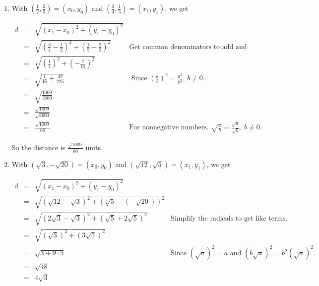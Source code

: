\documentclass{ximera}
\begin{document}
\begin{example}
\begin{enumerate}
\setlength{\extrarowheight}{2pt}

 

So the distance is $3 \sqrt{5}$ units.

\item With $\left( \frac{1}{2}, \frac{2}{3}\right) =  \left(x_0, y_0\right)$ and  $\left( \frac{3}{4}, \frac{1}{5}\right) = \left(x_1, y_1\right)$, we get

\setlength{\extrarowheight}{3pt}

\[ \begin{array}{rclr}

 d & = & \sqrt{\left(x_1 - x_0 \right)^2 + \left(y_1 - y_0 \right)^2} & \\
   & = & \sqrt{ \left(\frac{3}{4}-\frac{1}{2} \right)^2 + \left(\frac{1}{5} - \frac{2}{3} \right)^2} &  \text{Get common denominators to add and subtract fractions.}\\
   & = & \sqrt{\left(\frac{1}{4} \right)^2 + \left(-\frac{7}{15} \right)^2} &\\
   & = & \sqrt{\frac{1}{16} + \frac{49}{225}} &  \text{ Since $\left(\frac{a}{b}\right)^2 = \frac{a^2}{b^2}$, $b \neq 0$.}\\
   & = & \sqrt{\frac{1009}{3600}} & \\
   & = & \frac{\sqrt{1009}}{\sqrt{3600}} &  \\
   & = & \frac{\sqrt{1009}}{60} & \text{For nonnegative numbers, $\sqrt{\frac{a}{b}} = \frac{\sqrt{a}}{\sqrt{b}}$, $b \neq 0$.} \end{array} \]

\setlength{\extrarowheight}{2pt}

 

So the distance is $\frac{\sqrt{1009}}{60}$ units.

\item With $(\sqrt{3}, -\sqrt{20}) =  \left(x_0, y_0\right)$ and  $(\sqrt{12}, \sqrt{5}) = \left(x_1, y_1\right)$, we get

\setlength{\extrarowheight}{3pt}

\[ \begin{array}{rclr}

 d & = & \sqrt{\left(x_1 - x_0 \right)^2 + \left(y_1 - y_0 \right)^2} & \\
   & = & \sqrt{ \left(\sqrt{12}- \sqrt{3} \right)^2 + \left(\sqrt{5} - (-\sqrt{20})\right)^2} & \\
   & = & \sqrt{\left(2\sqrt{3} - \sqrt{3} \right)^2 + \left(\sqrt{5}+2\sqrt{5} \right)^2} &  \text{Simplify the radicals to get like terms.}\\
   & = & \sqrt{\left(\sqrt{3}\right)^2 + \left(3 \sqrt{5}\right)^2} &  \\
   & = & \sqrt{3 + 9 \cdot 5} & \text{Since $(\sqrt{a})^2 = a$ and $(b \sqrt{a})^2 = b^2 (\sqrt{a})^2$.} \\
   & = & \sqrt{48} &  \\
   & = & 4\sqrt{3} &  \end{array} \]


\end{enumerate}
\end{example}
\end{document}
